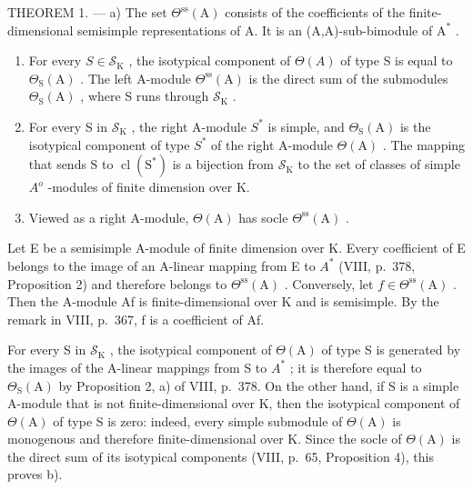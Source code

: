 THEOREM 1. --- a) The set \(\Theta^{\mathrm{ss}}(\mathrm{A})\) consists of the coefficients of the finite-dimensional semisimple representations of A. It is an (A,A)-sub-bimodule of \(\mathrm{A}^*\) .

\begin{enumerate}
\def\labelenumi{\alph{enumi})}
\setcounter{enumi}{1}
\item
  For every \(S \in \mathcal{S}_{\mathrm{K}}\) , the isotypical component of \(\Theta(A)\) of type S is equal to \(\Theta_{\mathrm{S}}(\mathrm{A})\) . The left A-module \(\Theta^{\mathrm{ss}}(\mathrm{A})\) is the direct sum of the submodules \(\Theta_{\mathrm{S}}(\mathrm{A})\) , where S runs through \(\mathcal{S}_{\mathrm{K}}\) .
\item
  For every S in \(\mathcal{S}_{\mathrm{K}}\) , the right A-module \(S^{*}\) is simple, and \(\Theta_{\mathrm{S}}(\mathrm{A})\) is the isotypical component of type \(S^{*}\) of the right A-module \(\Theta(\mathrm{A})\) . The mapping that sends S to \(\operatorname{cl}(\mathrm{S}^{*})\) is a bijection from \(\mathcal{S}_{\mathrm{K}}\) to the set of classes of simple \(A^{o}\) -modules of finite dimension over K.
\item
  Viewed as a right A-module, \(\Theta (\mathrm{A})\) has socle \(\Theta^{\mathrm{ss}}(\mathrm{A})\) .
\end{enumerate}

Let E be a semisimple A-module of finite dimension over K. Every coefficient of E belongs to the image of an A-linear mapping from E to \(A^{*}\) (VIII, p.~378, Proposition 2) and therefore belongs to \(\Theta^{\mathrm{ss}}(\mathrm{A})\) . Conversely, let \(f \in \Theta^{\mathrm{ss}}(\mathrm{A})\) . Then the A-module Af is finite-dimensional over K and is semisimple. By the remark in VIII, p.~367, f is a coefficient of Af.

For every S in \(\mathcal{S}_{\mathrm{K}}\) , the isotypical component of \(\Theta(\mathrm{A})\) of type S is generated by the images of the A-linear mappings from S to \(A^{*}\) ; it is therefore equal to \(\Theta_{\mathrm{S}}(\mathrm{A})\) by Proposition 2, a) of VIII, p.~378. On the other hand, if S is a simple A-module that is not finite-dimensional over K, then the isotypical component of \(\Theta(\mathrm{A})\) of type S is zero: indeed, every simple submodule of \(\Theta(\mathrm{A})\) is monogenous and therefore finite-dimensional over K. Since the socle of \(\Theta(\mathrm{A})\) is the direct sum of its isotypical components (VIII, p.~65, Proposition 4), this proves b).

